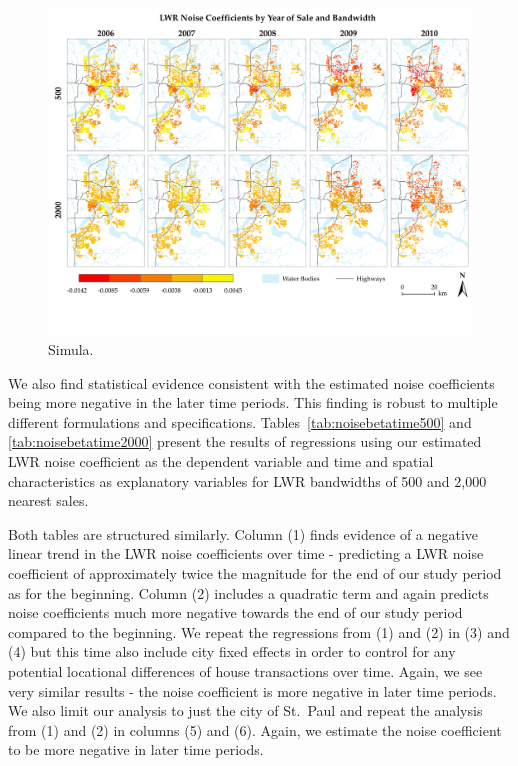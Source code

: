 \documentclass{article}\usepackage{graphicx, color}
\begin{document}
\begin{figure}
 \includegraphics[trim = 0cm 2cm 0cm 0cm, clip = true, width = \textwidth]{../graphs/Noise_50_200_ByYear}
 \caption{Simula.}
 \label{fig:NoiseTime}
\end{figure}

We also find statistical evidence consistent with the estimated noise coefficients being more negative in the later time periods. This finding is robust to multiple different formulations and specifications. Tables~\ref{tab:noisebetatime500} and \ref{tab:noisebetatime2000} present the results of regressions using our estimated LWR noise coefficient as the dependent variable and time and spatial characteristics as explanatory variables for LWR bandwidths of 500 and 2,000 nearest sales.

Both tables are structured similarly. Column (1) finds evidence of a negative linear trend in the LWR noise coefficients over time - predicting a LWR noise coefficient of approximately twice the magnitude for the end of our study period as for the beginning. Column (2) includes a quadratic term and again predicts noise coefficients much more negative towards the end of our study period compared to the beginning. We repeat the regressions from (1) and (2) in (3) and (4) but this time also include city fixed effects in order to control for any potential locational differences of house transactions over time. Again, we see very similar results - the noise coefficient is more negative in later time periods. We also limit our analysis to just the city of St.\ Paul and repeat the analysis from (1) and (2) in columns (5) and (6). Again, we estimate the noise coefficient to be more negative in later time periods.
\end{document}
